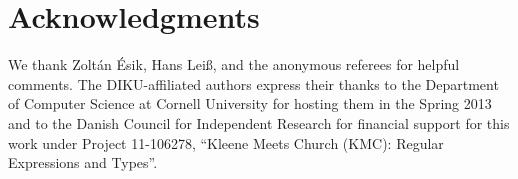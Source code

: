 \documentclass[copyright,creativecommons]{eptcs}
\theoremstyle{remark}
\begin{document}
\section*{Acknowledgments}

We thank Zolt{\'an} {\'E}sik, Hans Lei\ss, and the anonymous referees for helpful comments.  The DIKU-affiliated authors express their thanks to the Department of Computer Science at Cornell University for hosting them in the Spring 2013 and to the Danish Council for Independent Research for financial support for this work under Project 11-106278, ``Kleene Meets Church (KMC): Regular Expressions and Types''.



\end{document}
